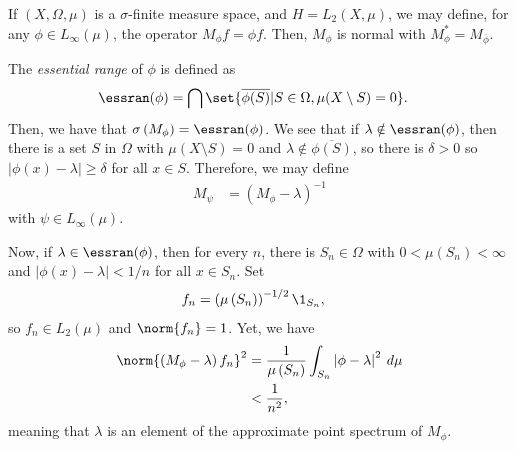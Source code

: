 \documentclass[10pt]{mypackage}
\begin{document}
\begin{example}
  If $\left( X,\Omega,\mu \right)$ is a $\sigma$-finite measure space, and $H = L_2\left( X,\mu \right)$, we may define, for any $\phi\in L_{\infty}(\mu)$, the operator $M_{\phi}f = \phi f$. Then, $M_{\phi}$ is normal with $M_{\phi}^{\ast} = M_{ \overline{\phi} }$.

  The \textit{essential range} of $\phi$ is defined as
  \begin{align*}
    \essran(\phi) &= \bigcap\set{ \overline{\phi(S)} | S\in \Omega,\mu(X\setminus S) = 0}.
  \end{align*}
  Then, we have that $\sigma\left( M_{\phi} \right) = \essran(\phi)$. We see that if $\lambda\notin \essran(\phi)$, then there is a set $S$ in $\Omega$ with $\mu\left( X\setminus S \right) = 0$ and $\lambda\notin \overline{\phi(S)}$, so there is $\delta > 0$ so $ \left\vert \phi(x)-\lambda \right\vert\geq \delta $ for all $x\in S$. Therefore, we may define
  \begin{align*}
    M_{\psi} &= \left( M_{\phi} - \lambda \right)^{-1}
  \end{align*}
  with $\psi\in L_{\infty}(\mu)$.

  Now, if $\lambda\in \essran(\phi)$, then for every $n$, there is $S_n\in \Omega$ with $0 < \mu\left(S_n\right) < \infty$ and $ \left\vert \phi(x)-\lambda \right\vert < 1/n $ for all $x\in S_n$. Set
  \begin{align*}
    f_n &= \left( \mu\left( S_n \right) \right)^{-1/2}\1_{S_n},
  \end{align*}
  so $f_n\in L_2\left( \mu \right)$ and $\norm{f_n} = 1$. Yet, we have
  \begin{align*}
    \norm{\left( M_{\phi}-\lambda \right)f_n}^2 &= \frac{1}{\mu\left( S_n \right)} \int_{S_n}^{} \left\vert \phi-\lambda \right\vert^2\:d\mu\\
                                                &< \frac{1}{n^2},
  \end{align*}
  meaning that $\lambda$ is an element of the approximate point spectrum of $M_{\phi}$.
\end{example}
\end{document}
